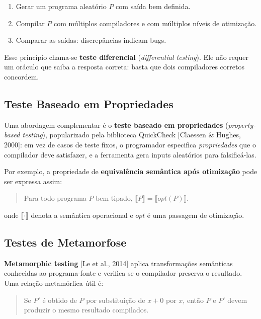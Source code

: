 \begin{enumerate}
  \item Gerar um programa aleatório \(P\) com saída bem definida.
  \item Compilar \(P\) com múltiplos compiladores e com múltiplos
    níveis de otimização.
  \item Comparar as saídas: discrepâncias indicam bugs.
\end{enumerate}

Esse princípio chama-se \textbf{teste diferencial} (\emph{differential
testing}). Ele não requer um oráculo que saiba a resposta correta:
basta que dois compiladores corretos concordem.

\subsection{Teste Baseado em Propriedades}

Uma abordagem complementar é o \textbf{teste baseado em propriedades}
(\emph{property-based testing}), popularizado pela biblioteca QuickCheck
[Claessen \& Hughes, 2000]: em vez de casos de teste fixos, o
programador especifica \emph{propriedades} que o compilador deve
satisfazer, e a ferramenta gera inputs aleatórios para falsificá-las.

Por exemplo, a propriedade de \textbf{equivalência semântica após
otimização} pode ser expressa assim:

\begin{quote}
  Para todo programa \(P\) bem tipado,
  \(\llbracket P \rrbracket = \llbracket \mathit{opt}(P) \rrbracket\).
\end{quote}

onde \(\llbracket \cdot \rrbracket\) denota a semântica operacional e
\(\mathit{opt}\) é uma passagem de otimização.

\subsection{Testes de Metamorfose}

\textbf{Metamorphic testing} [Le et al., 2014] aplica transformações
semânticas conhecidas ao programa-fonte e verifica se o compilador
preserva o resultado. Uma relação metamórfica útil é:

\begin{quote}
  Se \(P'\) é obtido de \(P\) por substituição de \(x + 0\) por \(x\),
  então \(P\) e \(P'\) devem produzir o mesmo resultado compilados.
\end{quote}

